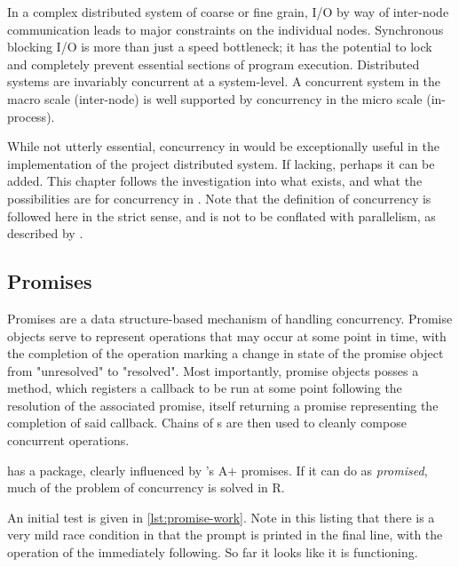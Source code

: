 
In a complex distributed system of coarse or fine grain, I/O by way of inter-node communication leads to major constraints on the individual nodes.
Synchronous blocking I/O is more than just a speed bottleneck; it has the potential to lock and completely prevent essential sections of program execution.
Distributed systems are invariably concurrent at a system-level.
A concurrent system in the macro scale (inter-node) is well supported by concurrency in the micro scale (in-process).

While not utterly essential, concurrency in \R would be exceptionally useful in the implementation of the project distributed system.
If lacking, perhaps it can be added.
This chapter follows the investigation into what exists, and what the possibilities are for concurrency in \R.
Note that the definition of concurrency is followed here in the strict sense, and is not to be conflated with parallelism, as described by \textcite{pike2012concurrency}.

\subsection{Promises}\label{subsec:promises}

Promises are a data structure-based mechanism of handling concurrency\cite{liskov1988promises}.
Promise objects serve to represent operations that may occur at some point in time, with the completion of the operation marking a change in state of the promise object from "unresolved" to "resolved".
Most importantly, promise objects posses a  method, which registers a callback to be run at some point following the resolution of the associated promise, itself returning a promise representing the completion of said callback.
Chains of s are then used to cleanly compose concurrent operations.

\R has a  package, clearly influenced by 's A+ promises\cite{cheng2021promises}.
If it can do as \textit{promised}, much of the problem of concurrency is solved in R.

An initial test is given in \cref{lst:promise-work}.
Note in this listing that there is a very mild race condition in that the prompt is printed in the final line, with the operation of the  immediately following.
So far it looks like it is functioning.


